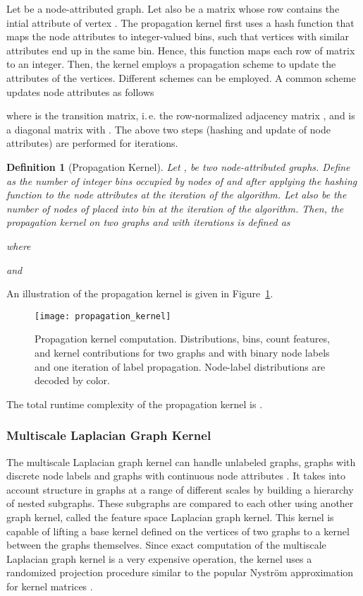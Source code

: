 \documentclass[twoside,11pt]{article}
\newcommand{\ie}{i.\,e. }
\newtheorem{definition}{Definition}
\begin{document}
Let  be a node-attributed graph.
Let also  be a matrix whose  row contains the intial attribute of vertex .
The propagation kernel first uses a hash function that maps the node attributes to integer-valued bins, such that vertices with similar attributes end up in the same bin.
Hence, this function maps each row of matrix  to an integer.
Then, the kernel employs a propagation scheme to update the attributes of the vertices.
Different schemes can be employed.
A common scheme updates node attributes as follows

where  is the transition matrix, \ie the row-normalized adjacency matrix , and  is a diagonal matrix with .
The above two steps (hashing and update of node attributes) are performed for  iterations.

\begin{definition}[Propagation Kernel]
  Let ,  be two node-attributed graphs.
  Define  as the number of integer bins occupied by nodes of  and  after applying the hashing function to the node attributes at the  iteration of the algorithm.
  Let also  be the number of nodes of  placed into bin  at the  iteration of the algorithm.
  Then, the propagation kernel on two graphs  and  with  iterations is defined as
  
  where
  
  and
  
\end{definition}
An illustration of the propagation kernel is given in Figure~\ref{fig:propagation_kernel}.
\begin{figure}[t]
  \centering
  \texttt{[image: propagation\_kernel]}
  \caption{Propagation kernel computation. Distributions, bins, count features, and kernel contributions for two graphs  and  with binary node labels and one iteration of label propagation. Node-label distributions are decoded by color.}
  \label{fig:propagation_kernel}
\end{figure}
The total runtime complexity of the propagation kernel is .


\subsubsection{Multiscale Laplacian Graph Kernel}
The multiscale Laplacian graph kernel can handle unlabeled graphs, graphs with discrete node labels and graphs with continuous node attributes \cite{kondor2016multiscale}.
It takes into account structure in graphs at a range of different scales by building a hierarchy of nested subgraphs.
These subgraphs are compared to each other using another graph kernel, called the feature space Laplacian graph kernel.
This kernel is capable of lifting a base kernel defined on the vertices of two graphs to a kernel between the graphs themselves.
Since exact computation of the multiscale Laplacian graph kernel is a very expensive operation, the kernel uses a randomized projection procedure  similar to the popular Nystr{\"o}m approximation for kernel matrices \cite{williams2001using}.
\end{document}
